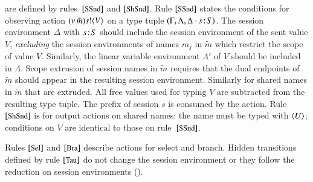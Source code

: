  are defined by rules~$\eltsrule{SSnd}$
and $\eltsrule{ShSnd}$.  
Rule $\eltsrule{SSnd}$ states the conditions for observing action
$(\nu\, \tilde{m}) s ! \langle V \rangle$ on a type tuple 
$(\Gamma, \Lambda, \Delta\cdot s \! : \! S)$. 
The session environment $\Delta$ with $s \! : \! S$ 
should include the session environment of the sent value $V$, 
{\em excluding} the session environments of names $m_j$ 
in $\tilde{m}$ which restrict the scope of value $V$. 
Similarly, the linear variable environment 
$\Lambda'$ of $V$ should be included in $\Lambda$. 
Scope extrusion of session names in $\tilde{m}$ requires
that the dual endpoints of $\tilde{m}$ should appear in
the resulting session environment. Similarly for shared 
names in $\tilde{m}$ that are extruded.  
All free values used for typing $V$ are subtracted from the
resulting type tuple. The prefix of session $s$ is consumed
by the action.
Rule $\eltsrule{ShSnd}$ is for output actions on shared names:
the name must be typed with $\langle U \rangle$; conditions on $V$ are identical to those
on rule~$\eltsrule{SSnd}$.

Rules $\eltsrule{Sel}$ and $\eltsrule{Bra}$ describe actions for
select and branch.
Hidden transitions defined by rule $\eltsrule{Tau}$ 
do not change the session environment or they follow the reduction on session
environments ().



